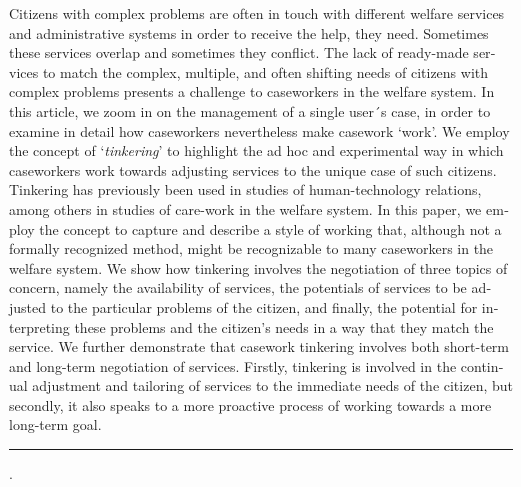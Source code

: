     \begin{adjustwidth}{20mm}{20mm}
\label{paper2:abstract}
    \bigskip
    \begin{otherlanguage}{english}
    {\small

\noindent Citizens with complex problems are often in touch with different welfare services and administrative systems in order to receive the help, they need. Sometimes these services overlap and sometimes they conflict. The lack of ready-made services to match the complex, multiple, and often shifting needs of citizens with complex problems presents a challenge to caseworkers in the welfare system. In this article, we zoom in on the management of a single user´s case, in order to examine in detail how caseworkers nevertheless make casework ‘work’. We employ the concept of ‘\textit{tinkering}’ to highlight the ad hoc and experimental way in which caseworkers work towards adjusting services to the unique case of such citizens. Tinkering has previously been used in studies of human-technology relations, among others in studies of care-work in the welfare system. In this paper, we employ the concept to capture and describe a style of working that, although not a formally recognized method, might be recognizable to many caseworkers in the welfare system. We show how tinkering involves the negotiation of three topics of concern, namely the availability of services, the potentials of services to be adjusted to the particular problems of the citizen, and finally, the potential for interpreting these problems and the citizen’s needs in a way that they match the service. We further demonstrate that casework tinkering involves both short-term and long-term negotiation of services. Firstly, tinkering is involved in the continual adjustment and tailoring of services to the immediate needs of the citizen, but secondly, it also speaks to a more proactive process of working towards a more long-term goal. 

\smallskip
\noindent\rule{\linewidth}{1pt}

%
\hspace*{0.75em}{%
citizens with complex problems;
casework;
case studies;
tinkering}.



    } %


    \end{otherlanguage}

    \end{adjustwidth}
